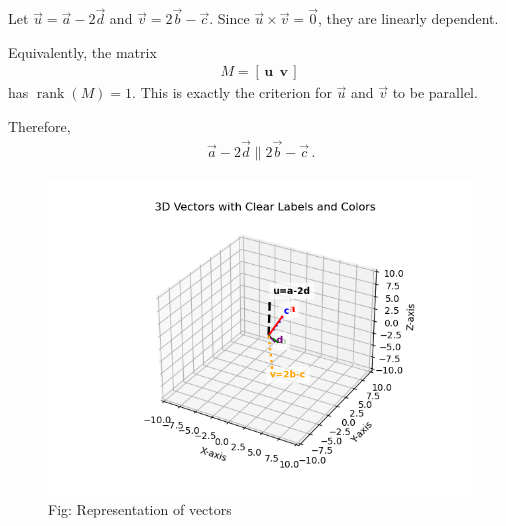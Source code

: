 \documentclass[journal]{IEEEtran}
\begin{document}
Let $\vec u=\vec a-2\vec d$ and $\vec v=2\vec b-\vec c$.  
Since $\vec u\times \vec v=\vec 0$, they are linearly dependent.

Equivalently, the matrix
\begin{align}
M = [\,\mathbf u \ \ \mathbf v\,]
\end{align}
has $\operatorname{rank}(M)=1$.
 This is exactly the criterion for $\vec u$ and $\vec v$ to be parallel.

Therefore,
\begin{align}
\boxed{\,\vec a-2\vec d \parallel 2\vec b-\vec c\,}.
\end{align}

\begin{figure}[h!]
  \centering
  \includegraphics[width=0.9\columnwidth]{figs/fig4.png} 
   \caption*{Fig: Representation of vectors}
  \label{Fig4}
\end{figure}
\end{document}
